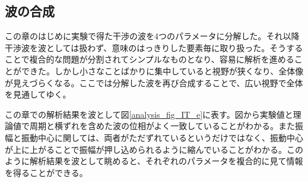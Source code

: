 \subsection{波の合成}
この章のはじめに実験で得た干渉の波を4つのパラメータに分解した。それ以降干渉波を波としては扱わず、意味のはっきりした要素毎に取り扱った。そうすることで複合的な問題が分割されてシンプルなものとなり、容易に解析を進めることができた。しかし小さなことばかりに集中していると視野が狭くなり、全体像が見えづらくなる。ここでは分解した波を再び合成することで、広い視野で全体を見通してゆく。

この章での解析結果を波として図\ref{analysis_fig_IT_e}に表す。図から実験値と理論値で周期と横ずれを含めた波の位相がよく一致していることがわかる。また振幅と振動中心に関しては、両者がただずれているというだけではなく、振動中心が上に上がることで振幅が押し込められるように縮んでいることがわかる。このように解析結果を波として眺めると、それぞれのパラメータを複合的に見て情報を得ることができる。
